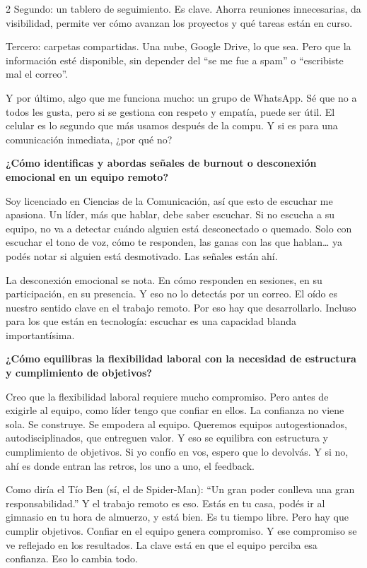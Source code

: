 \documentclass[12pt,spanish,Letterpaper,openany]{book}
\begin{document}
\begin {multicols}{2}
Segundo: un tablero de seguimiento. Es clave. Ahorra reuniones innecesarias, da visibilidad, permite ver cómo avanzan los proyectos y qué tareas están en curso.

Tercero: carpetas compartidas. Una nube, Google Drive, lo que sea. Pero que la información esté disponible, sin depender del ``se me fue a spam'' o ``escribiste mal el correo''.

Y por último, algo que me funciona mucho: un grupo de WhatsApp. Sé que no a todos les gusta, pero si se gestiona con respeto y empatía, puede ser útil. El celular es lo segundo que más usamos después de la compu. Y si es para una comunicación inmediata, ¿por qué no?

\textbf{¿Cómo identificas y abordas señales de burnout o desconexión emocional en un equipo remoto?}

Soy licenciado en Ciencias de la Comunicación, así que esto de escuchar me apasiona.
Un líder, más que hablar, debe saber escuchar. Si no escucha a su equipo, no va a detectar cuándo alguien está desconectado o quemado.
Solo con escuchar el tono de voz, cómo te responden, las ganas con las que hablan\ldots{} ya podés notar si alguien está desmotivado. Las señales están ahí.

La desconexión emocional se nota. En cómo responden en sesiones, en su participación, en su presencia. Y eso no lo detectás por un correo. El oído es nuestro sentido clave en el trabajo remoto. Por eso hay que desarrollarlo.
Incluso para los que están en tecnología: escuchar es una capacidad blanda importantísima.

\textbf{¿Cómo equilibras la flexibilidad laboral con la necesidad de estructura y cumplimiento de objetivos?}

Creo que la flexibilidad laboral requiere mucho compromiso. Pero antes de exigirle al equipo, como líder tengo que confiar en ellos.
La confianza no viene sola. Se construye. Se empodera al equipo. Queremos equipos autogestionados, autodisciplinados, que entreguen valor.
Y eso se equilibra con estructura y cumplimiento de objetivos. Si yo confío en vos, espero que lo devolvás. Y si no, ahí es donde entran las retros, los uno a uno, el feedback.

Como diría el Tío Ben (sí, el de Spider-Man): ``Un gran poder conlleva una gran responsabilidad.'' Y el trabajo remoto es eso. Estás en tu casa, podés ir al gimnasio en tu hora de almuerzo, y está bien. Es tu tiempo libre.
Pero hay que cumplir objetivos. Confiar en el equipo genera compromiso. Y ese compromiso se ve reflejado en los resultados.
La clave está en que el equipo perciba esa confianza. Eso lo cambia todo.


\end{multicols}
\end{document}
